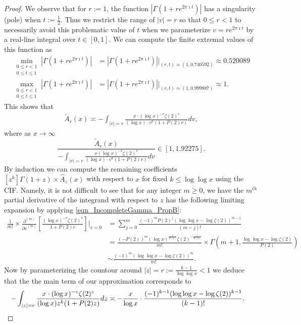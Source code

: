 \documentclass[11pt,reqno,a4letter]{article}
\numberwithin{figure}{section}
\numberwithin{table}{section}
\theoremstyle{plain}
\numberwithin{theorem}{section}
\theoremstyle{definition}
\begin{document}
\begin{proof}
We observe that for $r := 1$, the function $|\Gamma(1+re^{2\pi\imath t})|$ has a 
singularity (pole) when $t := \frac{1}{2}$. Thus we restrict the range of $|v| = r$ 
so that $0 \leq r < 1$ to necessarily avoid this problematic value of $t$ when 
we parameterize $v = r e^{2\pi\imath t}$ by a real-line integral over $t \in [0, 1]$. 
We can compute the finite extremal values of this function as 
\begin{align*} 
\min\limits_{\substack{0 \leq r < 1 \\ 0 \leq t \leq 1}} |\Gamma(1+re^{2\pi\imath t})| & = 
     |\Gamma(1+re^{2\pi\imath t})| \Biggr\rvert_{(r,t) \approx (1, 0.740592)} \approx 
     0.520089 \\ 
\max\limits_{\substack{0 \leq r < 1 \\ 0 \leq t \leq 1}} |\Gamma(1+re^{2\pi\imath t})| & = 
     |\Gamma(1+re^{2\pi\imath t})| \Biggr\rvert_{(r,t) \approx (1, 0.999887)} \approx 1. 
\end{align*} 
This shows that 
\begin{align} 
\label{eqn_WideTildeArx_CountourIntDef_v2} 
\widetilde{A}_r(x) \asymp 
     -\int_{|v|=r} \frac{x \cdot (\log x)^{-v} \zeta(2)^{v}}{(\log x) \cdot 
     v^{k} (1 + P(2) v)} dv, 
\end{align} 
where as $x \rightarrow \infty$ 
\[
\frac{\widetilde{A}_r(x)}{-\int_{|v|=r} \frac{x (\log x)^{-v} \zeta(2)^{v}}{(\log x) \cdot 
     v^{k} (1 + P(2) v)} dv} \in [1, 1.92275]. 
\] 
By induction we can compute the remaining coefficients 
$[z^k] \Gamma(1+z) \times \widehat{A}_z(x)$ with respect to 
$x$ for fixed $k \leq \log\log x$ using the CIF. 
Namely, it is not difficult to see that for any integer $m \geq 0$, 
we have the $m^{th}$ partial derivative of the integrand with respect to $z$ 
has the following limiting expansion by applying 
\eqref{eqn_IncompleteGamma_PropB}: 
\begin{align*} 
\frac{1}{m!} \times \frac{\partial^{(m)}}{{\partial v}^{(m)}}\left[ 
     \frac{(\log x)^{-v} \zeta(2)^{v}}{1 + P(2) v}\right] \Biggr\rvert_{v=0} & = 
     \sum_{j=0}^{m} \frac{(-1)^{m} P(2)^{j} (\log\log x - \log\zeta(2))^{m-j}}{(m-j)!} \\ 
     & = 
     \frac{(-P(2))^{m} (\log x)^{\frac{1}{P(2)}} \zeta(2)^{-\frac{1}{P(2)}}}{m!} \times 
     \Gamma\left(m+1, \frac{\log\log x - \log\zeta(2)}{P(2)}\right) \\ 
     & \sim \frac{(-1)^m (\log\log x -\log\zeta(2))^{m}}{m!}. 
\end{align*} 
Now by parameterizing the countour around $|z| = r := \frac{k-1}{\log\log x} < 1$ we 
deduce that the the main term of our approximation corresponds to 
\begin{align*} 
-\int_{|z|=r} \frac{x \cdot (\log x)^{-z} \zeta(2)^{z}}{(\log x) z^{k} (1 + P(2) z)} dz & \asymp 
     -\frac{x}{\log x} \cdot \frac{(-1)^{k-1} (\log\log x - \log\zeta(2))^{k-1}}{(k-1)!}. 
     \qedhere 
\end{align*} 
\end{proof} 
\end{document}
